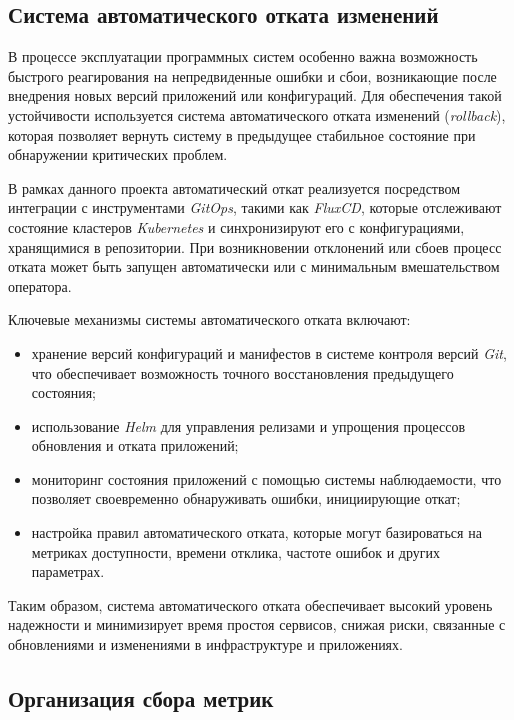 \subsection{Система автоматического отката изменений}

В процессе эксплуатации программных систем особенно важна возможность быстрого реагирования на непредвиденные ошибки и сбои, возникающие после внедрения новых версий приложений или конфигураций. Для обеспечения такой устойчивости используется система автоматического отката изменений (\textit{rollback}), которая позволяет вернуть систему в предыдущее стабильное состояние при обнаружении критических проблем.

В рамках данного проекта автоматический откат реализуется посредством интеграции с инструментами \textit{GitOps}, такими как \textit{FluxCD}, которые отслеживают состояние кластеров \textit{Kubernetes} и синхронизируют его с конфигурациями, хранящимися в репозитории. При возникновении отклонений или сбоев процесс отката может быть запущен автоматически или с минимальным вмешательством оператора.

Ключевые механизмы системы автоматического отката включают:

\begin{itemize}
    \item хранение версий конфигураций и манифестов в системе контроля версий \textit{Git}, что обеспечивает возможность точного восстановления предыдущего состояния;
    \item использование \textit{Helm} для управления релизами и упрощения процессов обновления и отката приложений;
    \item мониторинг состояния приложений с помощью системы наблюдаемости, что позволяет своевременно обнаруживать ошибки, инициирующие откат;
    \item настройка правил автоматического отката, которые могут базироваться на метриках доступности, времени отклика, частоте ошибок и других параметрах.
\end{itemize}

Таким образом, система автоматического отката обеспечивает высокий уровень надежности и минимизирует время простоя сервисов, снижая риски, связанные с обновлениями и изменениями в инфраструктуре и приложениях.



\subsection{Организация сбора метрик}

